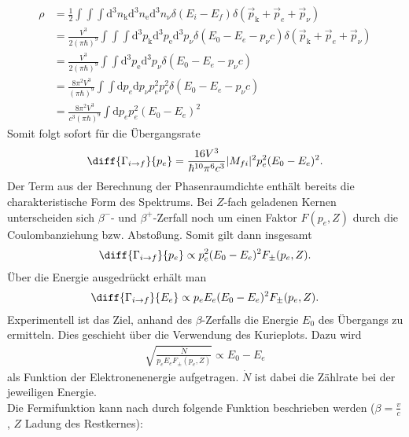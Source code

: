 \begin{align*}
  \rho&= \frac{1}{2}\int\int \int \mathrm{d}^3n_\mathrm{k} \mathrm{d}^3n_\mathrm{e}  \mathrm{d}^3n_\nu \delta (E_i-E_f) \delta (\vec{p}_\mathrm{k}+\vec{p}_e+\vec{p}_\nu)\\
  &=\frac{V^3}{2(\pi \hbar)^9} \int \int \int \mathrm{d}^3p_\mathrm{k}   \mathrm{d}^3p_\mathrm{e}  \mathrm{d}^3p_\nu\delta (E_0-E_e-p_\nu c) \delta (\vec{p}_\mathrm{k}+\vec{p}_e+\vec{p}_\nu)\\
  &=\frac{V^3}{2(\pi \hbar)^9}  \int \int  \mathrm{d}^3p_\mathrm{e} \mathrm{d}^3p_\nu \delta (E_0-E_e-p_\nu c)\\
  &= \frac{8 \pi^2 V^3}{(\pi \hbar)^9} \int \int \mathrm{d}p_e \mathrm{d}p_\nu p_e^2 p_\nu^2\delta (E_0-E_e-p_\nu c)\\
  &=\frac{8 \pi^2 V^3}{c^3 (\pi \hbar)^9} \int \mathrm{d}p_e p_e^2 (E_0-E_e)^2
\end{align*}
Somit folgt sofort für die Übergangsrate
\begin{align*}
  \diff{\Gamma_{i \rightarrow f}}{p_e}=\frac{16 V^3}{\hbar^{10} \pi^6 c^3}|M_{fi}|^2  p_e^2 (E_0-E_e)^2.
\end{align*}
Der Term aus der Berechnung der Phasenraumdichte enthält bereits die charakteristische Form des Spektrums. Bei $Z$-fach geladenen Kernen unterscheiden sich $\beta^-$- und $\beta^+$-Zerfall noch um einen Faktor $F(p_e,Z)$ durch die Coulombanziehung bzw. Abstoßung. Somit gilt dann insgesamt 
\begin{align*}
  \diff{\Gamma_{i \rightarrow f}}{p_e} \propto p_e^2(E_0-E_e)^2 F_\pm(p_e,Z).
\end{align*}
Über die Energie ausgedrückt erhält man
\begin{align*}
  \diff{\Gamma_{i \rightarrow f}}{E_e} \propto p_eE_e(E_0-E_e)^2 F_\pm(p_e,Z).
\end{align*}
Experimentell ist das Ziel, anhand des $\beta$-Zerfalls die Energie $E_0$ des Übergangs zu ermitteln. Dies geschieht über die Verwendung des Kurieplots. Dazu wird 
\begin{align}
  \sqrt{\frac{\dot{N}}{p_eE_eF_\pm(p_e,Z)}} \propto E_0-E_e
  \label{equ:kurie}
\end{align}
als Funktion der Elektronenenergie aufgetragen. $\dot{N}$ ist dabei die Zählrate bei der jeweiligen Energie.\\

Die Fermifunktion kann nach \cite{fermi} durch folgende Funktion beschrieben werden ($\beta = \frac{v}{c}$, $Z$ Ladung des Restkernes):


